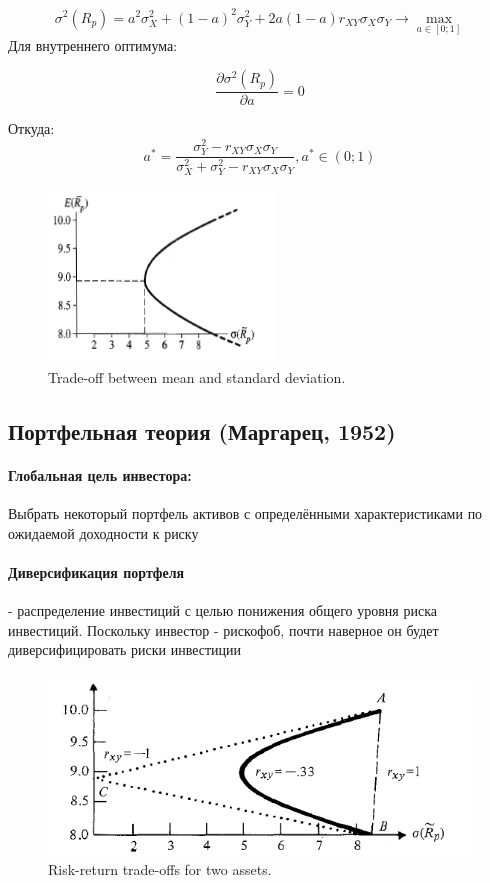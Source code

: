 \documentclass[a4paper,12pt]{article} %
\begin{document}
\[   \sigma^2(R_p) = a^2\sigma^2_X + (1-a)^2\sigma^2_Y + 2 a(1-a) r_{XY} \sigma_X  \sigma_Y  \longrightarrow \max_{a \in [0;1] }
   \]
   Для внутреннего оптимума:
   
  \[ \dfrac{\partial  \sigma^2(R_p) }{\partial a}  = 0\]
  
  Откуда:
  \[  a^{*} = \dfrac{ \sigma^2_Y - r_{XY} \sigma_X  \sigma_Y  }{\sigma^2_X + \sigma^2_Y - r_{XY} \sigma_X  \sigma_Y }, a^{*} \in (0;1) \]
  
  
 
 
 
 
   \begin{figure}[h!]
   	\centering
   	\includegraphics[width=0.4\linewidth]{screenshot007}
   	\caption{Trade-off between mean and standard deviation.}
   	\label{fig:screenshot007}
   \end{figure}
   
   
   
   \subsection{Портфельная теория (Маргарец, 1952)}
   
    
\paragraph{   Глобальная цель инвестора:}  Выбрать некоторый портфель активов с определёнными характеристиками по ожидаемой  доходности к риску

 
\paragraph{Диверсификация портфеля} - распределение инвестиций   с целью понижения общего уровня риска инвестиций.  Поскольку инвестор - рискофоб, почти наверное он будет диверсифицировать риски инвестиции 
 
 
   \begin{figure}[h!]
 	\centering
 	\includegraphics[width=0.7\linewidth]{screenshot008}
 	\caption{Risk-return trade-offs for two assets.}
 	\label{fig:screenshot008}
 \end{figure}
 
\end{document}
